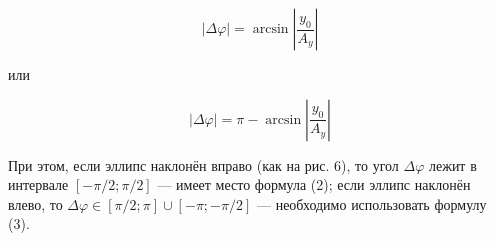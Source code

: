 \documentclass[14pt]{article}
\begin{document}
\begin{equation}
\left|\Delta \varphi\right| = \arcsin \left|\frac{y_0}{A_y}\right|
\end{equation}

\noindent или

\begin{equation}
\left|\Delta \varphi\right| = \pi - \arcsin \left|\frac{y_0}{A_y}\right|
\end{equation}

\noindent При этом, если эллипс наклонён вправо (как на рис. 6), то угол $\Delta\varphi$ лежит в интервале $[-\pi/2; \pi/2]$ — имеет место формула (2); если эллипс наклонён влево, то $\Delta\varphi \in [\pi/2; \pi] \cup [-\pi; -\pi/2]$ — необходимо
использовать формулу (3).

%
%
\end{document}
